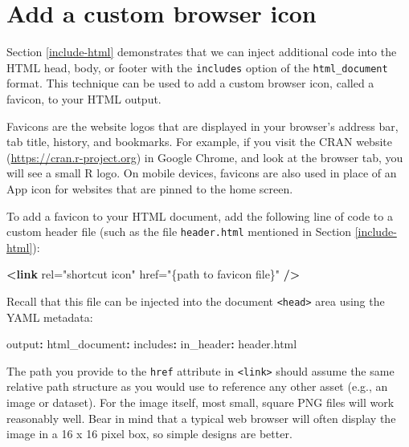 \documentclass[
  11pt,
]{krantz}
\newenvironment{Shaded}{\begin{snugshade}}{\end{snugshade}}
\newcommand{\AttributeTok}[1]{\textcolor[rgb]{0.61,0.61,0.61}{#1}}
\newcommand{\FunctionTok}[1]{\textcolor[rgb]{0,0,0}{#1}}
\newcommand{\KeywordTok}[1]{\textcolor[rgb]{0.27,0.27,0.27}{\textbf{#1}}}
\newcommand{\OtherTok}[1]{\textcolor[rgb]{0.37,0.37,0.37}{#1}}
\newcommand{\StringTok}[1]{\textcolor[rgb]{0.5,0.5,0.5}{#1}}
\begin{document}
\hypertarget{favicon}{%
\section{Add a custom browser icon}\label{favicon}}

Section \ref{include-html} demonstrates that we can inject additional code into the HTML head, body, or footer with the \texttt{includes} option of the \texttt{html\_document} format. This technique can be used to add a custom browser icon, called a favicon, to your HTML output.

Favicons are the website logos that are displayed in your browser's address bar, tab title, history, and bookmarks. For example, if you visit the CRAN website (\url{https://cran.r-project.org}) in Google Chrome, and look at the browser tab, you will see a small R logo. On mobile devices, favicons are also used in place of an App icon for websites that are pinned to the home screen.

To add a favicon to your HTML document, add the following line of code to a custom header file (such as the file \texttt{header.html} mentioned in Section \ref{include-html}):

\begin{Shaded}
\begin{Highlighting}[]
\KeywordTok{<link}\OtherTok{ rel=}\StringTok{"shortcut icon"}\OtherTok{ href=}\StringTok{"\{path to favicon file\}"} \KeywordTok{/>}
\end{Highlighting}
\end{Shaded}

Recall that this file can be injected into the document \texttt{\textless{}head\textgreater{}} area using the YAML metadata:

\begin{Shaded}
\begin{Highlighting}[]
\FunctionTok{output}\KeywordTok{:}
\AttributeTok{  }\FunctionTok{html_document}\KeywordTok{:}
\AttributeTok{    }\FunctionTok{includes}\KeywordTok{:}
\AttributeTok{      }\FunctionTok{in_header}\KeywordTok{:}\AttributeTok{ header.html}
\end{Highlighting}
\end{Shaded}

The path you provide to the \texttt{href} attribute in \texttt{\textless{}link\textgreater{}} should assume the same relative path structure as you would use to reference any other asset (e.g., an image or dataset). For the image itself, most small, square PNG files will work reasonably well. Bear in mind that a typical web browser will often display the image in a 16 x 16 pixel box, so simple designs are better.
\end{document}
